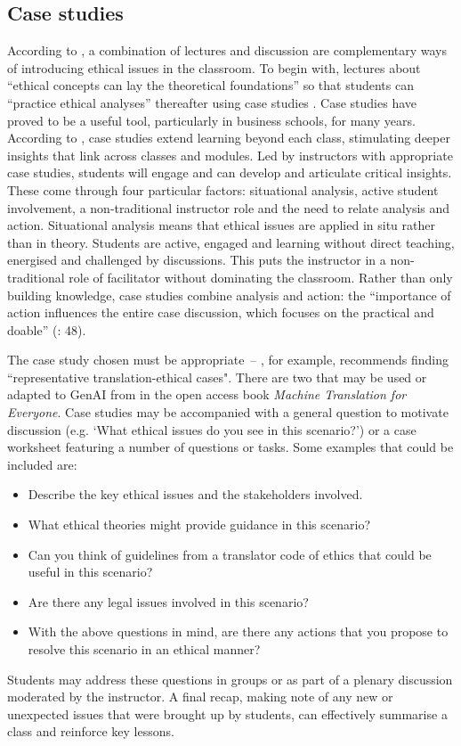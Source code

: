 \documentclass[output=paper]{langscibook}
\begin{document}
\subsection{Case studies}
According to \citet{benbunan-fich_guidelines_1998}, a combination of lectures and discussion are complementary ways of introducing ethical issues in the classroom. To begin with, lectures about “ethical concepts can lay the theoretical foundations” so that students can “practice ethical analyses” thereafter using case studies \citep[20]{benbunan-fich_guidelines_1998}. Case studies have proved to be a useful tool, particularly in business schools, for many years. According to \citet{barnes_teaching_1994}, case studies extend learning beyond each class, stimulating deeper insights that link across classes and modules. Led by instructors with appropriate case studies, students will engage and can develop and articulate critical insights. These come through four particular factors: situational analysis, active student involvement, a non-traditional instructor role and the need to relate analysis and action. Situational analysis means that ethical issues are applied in situ rather than in theory. Students are active, engaged and learning without direct teaching, energised and challenged by discussions. This puts the instructor in a non-traditional role of facilitator without dominating the classroom. Rather than only building knowledge, case studies combine analysis and action: the “importance of action influences the entire case discussion, which focuses on the practical and doable” (\citealt{barnes_teaching_1994}: 48).

The case study chosen must be appropriate~-- \citet[400]{Zhou2022}, for example, recommends finding ``representative translation-ethical cases". There are two that may be used or adapted to GenAI from \citet{moorkens2022_ethics} in the open access book \textit{Machine Translation for Everyone}. Case studies may be accompanied with a general question to motivate discussion (e.g. ‘What ethical issues do you see in this scenario?’) or a case worksheet featuring a number of questions or tasks. Some examples that could be included are:

\begin{itemize}
\item Describe the key ethical issues and the stakeholders involved.
\item What ethical theories might provide guidance in this scenario?
\item Can you think of guidelines from a translator code of ethics that could be useful in this scenario?
\item Are there any legal issues involved in this scenario?
\item With the above questions in mind, are there any actions that you propose to resolve this scenario in an ethical manner?
\end{itemize}
Students may address these questions in groups or as part of a plenary discussion moderated by the instructor. A final recap, making note of any new or unexpected issues that were brought up by students, can effectively summarise a class and reinforce key lessons.
\end{document}
